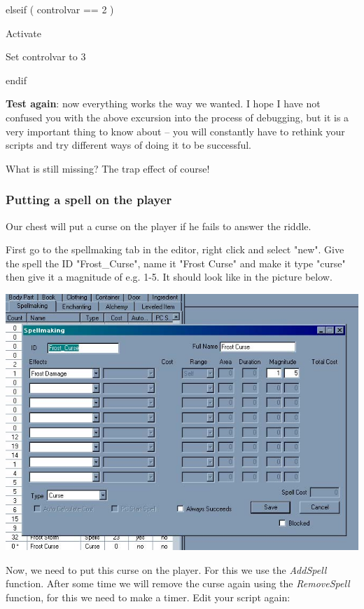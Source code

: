 \documentclass[
]{article}
\begin{document}

elseif ( controlvar == 2 )

Activate

Set controlvar to 3

endif

\textbf{Test again}: now everything works the way we wanted. I hope I
have not confused you with the above excursion into the process of
debugging, but it is a very important thing to know about -- you will
constantly have to rethink your scripts and try different ways of doing
it to be successful.

What is still missing? The trap effect of course!

\hypertarget{putting-a-spell-on-the-player}{%
\subsubsection{Putting a spell on the
player}\label{putting-a-spell-on-the-player}}

Our chest will put a curse on the player if he fails to answer the
riddle.

First go to the spellmaking tab in the editor, right click and select
"new". Give the spell the ID "Frost\_Curse", name it "Frost Curse" and
make it type "curse" then give it a magnitude of e.g. 1-5. It should
look like in the picture below.

\includegraphics{media/image4.jpg}

Now, we need to put this curse on the player. For this we use the
\emph{AddSpell} function. After some time we will remove the curse again
using the \emph{RemoveSpell} function, for this we need to make a timer.
Edit your script again:
\end{document}
